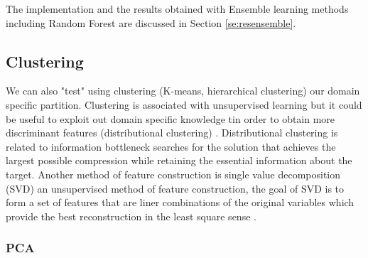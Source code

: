 \documentclass[11pt]{article}
\begin{document}
The implementation and the results obtained with Ensemble learning methods including Random Forest are discussed in Section \ref{se:resensemble}.



\subsection{Clustering}

We can also "test" using clustering (K-means, hierarchical clustering) our domain specific partition. Clustering is associated with unsupervised learning but it could be useful to exploit out domain specific knowledge tin order to obtain more discriminant features (distributional clustering) \cite{guyon2003introduction}. Distributional clustering is related to information bottleneck \cite{tishby2015deep} searches for the solution that achieves the largest possible compression while retaining the essential information about the target.
Another method of feature construction is single value decomposition (SVD) an unsupervised method of feature construction, the goal of SVD is to form a set of features that are liner combinations of the original variables which provide the best reconstruction in the least square sense \cite{duda2012pattern}.  

\subsubsection{PCA}
\end{document}

